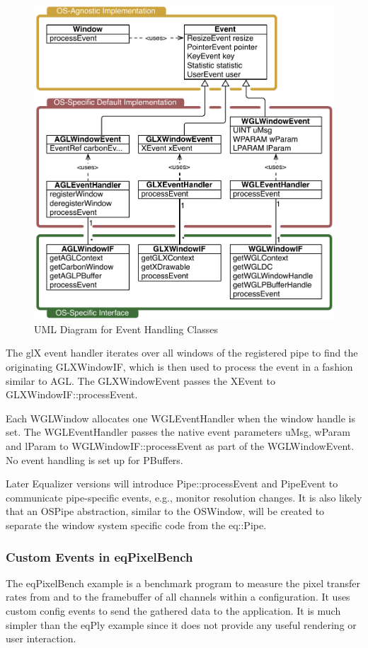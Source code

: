 \documentclass[10pt,a4]{scrartcl}
\begin{document}
\begin{figure}
  \includegraphics[width=.618\textwidth]{images/eventUML.pdf}
  {\caption{\small\label{fEventUML}UML Diagram for Event Handling Classes}}
\end{figure}
The glX event handler iterates over all windows of the registered pipe
to find the originating \textsf{GLXWindowIF}, which is then used to
process the event in a fashion similar to AGL. The
\textsf{GLXWindowEvent} passes the \textsf{XEvent} to
\textsf{GLXWindowIF::\-process\-Event}.

Each \textsf{WGLWindow} allocates one \textsf{WGLEventHandler} when the
window handle is set. The WGLEventHandler passes the native event
parameters \textsf{uMsg}, \textsf{wParam} and \textsf{lParam} to
\textsf{WGL\-Win\-dowIF::processEvent} as part of the
\textsf{WGLWindowEvent}. No event handling is set up for PBuffers.

Later Equalizer versions will introduce \textsf{Pipe::pro\-cess\-Event} and
\textsf{PipeEvent} to communicate pipe-specific events, e.g., monitor
resolution changes. It is also likely that an \textsf{OSPipe}
abstraction, similar to the \textsf{OSWindow}, will be created to
separate the window system specific code from the \textsf{eq::Pipe}.


\subsubsection{Custom Events in eqPixelBench}

The \textsf{eqPixelBench} example is a benchmark program to measure the
pixel transfer rates from and to the framebuffer of all channels within
a configuration. It uses custom config events to send the gathered data
to the application. It is much simpler than the \textsf{eqPly} example
since it does not provide any useful rendering or user interaction.
\end{document}
